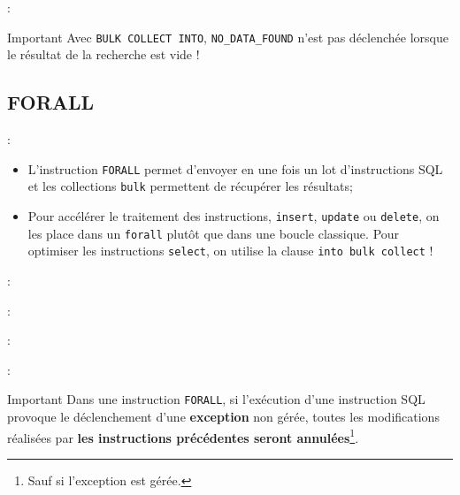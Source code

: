 \documentclass[10pt]{beamer}
\begin{document}
\begin{frame}{\secname : \subsecname}
    \begin{alertblock}{Important}
        Avec \lstinline[language=plsql]!BULK COLLECT INTO!, \lstinline[language=plsql]!NO_DATA_FOUND! n'est pas déclenchée lorsque le résultat de la recherche est vide !
    \end{alertblock}
\end{frame}

\subsection{FORALL}
\begin{frame}{\secname : \subsecname}
    \begin{itemize}
        \item L'instruction \lstinline[language=plsql]!FORALL! permet d'envoyer en une fois un lot d'instructions SQL et les collections \lstinline[language=plsql]!bulk! permettent de récupérer les résultats;
        \item Pour accélérer le traitement des instructions, \lstinline[language=plsql]!insert!, \lstinline[language=plsql]!update! ou \lstinline[language=plsql]!delete!, on les place dans un \lstinline[language=plsql]!forall! plutôt que dans une boucle classique. Pour optimiser les instructions \lstinline[language=plsql]!select!, on utilise la clause \lstinline[language=plsql]!into bulk collect! !
    \end{itemize}
\end{frame}

\begin{frame}{\secname : \subsecname}
    
\end{frame}

\begin{frame}[allowframebreaks]{\secname : \subsecname}
    
\end{frame}

\begin{frame}[allowframebreaks]{\secname : \subsecname}
    
\end{frame}


\begin{frame}[allowframebreaks]{\secname : \subsecname}
    \begin{alertblock}{Important}
        Dans une instruction \lstinline[language=plsql]!FORALL!, si l'exécution d'une instruction SQL provoque le déclenchement d'une \textbf{exception} non gérée, toutes les modifications réalisées par \textbf{les instructions précédentes seront annulées}\footnote{Sauf si l'exception est gérée.}.
    \end{alertblock}
\end{frame}
\end{document}
